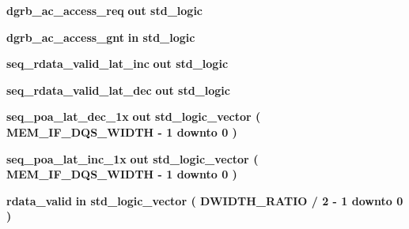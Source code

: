 \begin{DoxyCompactItemize}
\item 
{\bf dgrb\+\_\+ac\+\_\+access\+\_\+req}  {\bfseries {\bfseries \textcolor{keywordflow}{out}\textcolor{vhdlchar}{ }}} {\bfseries \textcolor{comment}{std\+\_\+logic}\textcolor{vhdlchar}{ }} 
\item 
{\bf dgrb\+\_\+ac\+\_\+access\+\_\+gnt}  {\bfseries {\bfseries \textcolor{keywordflow}{in}\textcolor{vhdlchar}{ }}} {\bfseries \textcolor{comment}{std\+\_\+logic}\textcolor{vhdlchar}{ }} 
\item 
{\bf seq\+\_\+rdata\+\_\+valid\+\_\+lat\+\_\+inc}  {\bfseries {\bfseries \textcolor{keywordflow}{out}\textcolor{vhdlchar}{ }}} {\bfseries \textcolor{comment}{std\+\_\+logic}\textcolor{vhdlchar}{ }} 
\item 
{\bf seq\+\_\+rdata\+\_\+valid\+\_\+lat\+\_\+dec}  {\bfseries {\bfseries \textcolor{keywordflow}{out}\textcolor{vhdlchar}{ }}} {\bfseries \textcolor{comment}{std\+\_\+logic}\textcolor{vhdlchar}{ }} 
\item 
{\bf seq\+\_\+poa\+\_\+lat\+\_\+dec\+\_\+1x}  {\bfseries {\bfseries \textcolor{keywordflow}{out}\textcolor{vhdlchar}{ }}} {\bfseries \textcolor{comment}{std\+\_\+logic\+\_\+vector}\textcolor{vhdlchar}{ }\textcolor{vhdlchar}{(}\textcolor{vhdlchar}{ }\textcolor{vhdlchar}{ }\textcolor{vhdlchar}{ }\textcolor{vhdlchar}{ }{\bfseries {\bf M\+E\+M\+\_\+\+I\+F\+\_\+\+D\+Q\+S\+\_\+\+W\+I\+D\+TH}} \textcolor{vhdlchar}{-\/}\textcolor{vhdlchar}{ } \textcolor{vhdldigit}{1} \textcolor{vhdlchar}{ }\textcolor{keywordflow}{downto}\textcolor{vhdlchar}{ }\textcolor{vhdlchar}{ } \textcolor{vhdldigit}{0} \textcolor{vhdlchar}{ }\textcolor{vhdlchar}{)}\textcolor{vhdlchar}{ }} 
\item 
{\bf seq\+\_\+poa\+\_\+lat\+\_\+inc\+\_\+1x}  {\bfseries {\bfseries \textcolor{keywordflow}{out}\textcolor{vhdlchar}{ }}} {\bfseries \textcolor{comment}{std\+\_\+logic\+\_\+vector}\textcolor{vhdlchar}{ }\textcolor{vhdlchar}{(}\textcolor{vhdlchar}{ }\textcolor{vhdlchar}{ }\textcolor{vhdlchar}{ }\textcolor{vhdlchar}{ }{\bfseries {\bf M\+E\+M\+\_\+\+I\+F\+\_\+\+D\+Q\+S\+\_\+\+W\+I\+D\+TH}} \textcolor{vhdlchar}{-\/}\textcolor{vhdlchar}{ } \textcolor{vhdldigit}{1} \textcolor{vhdlchar}{ }\textcolor{keywordflow}{downto}\textcolor{vhdlchar}{ }\textcolor{vhdlchar}{ } \textcolor{vhdldigit}{0} \textcolor{vhdlchar}{ }\textcolor{vhdlchar}{)}\textcolor{vhdlchar}{ }} 
\item 
{\bf rdata\+\_\+valid}  {\bfseries {\bfseries \textcolor{keywordflow}{in}\textcolor{vhdlchar}{ }}} {\bfseries \textcolor{comment}{std\+\_\+logic\+\_\+vector}\textcolor{vhdlchar}{ }\textcolor{vhdlchar}{(}\textcolor{vhdlchar}{ }\textcolor{vhdlchar}{ }\textcolor{vhdlchar}{ }\textcolor{vhdlchar}{ }{\bfseries {\bf D\+W\+I\+D\+T\+H\+\_\+\+R\+A\+T\+IO}} \textcolor{vhdlchar}{/}\textcolor{vhdlchar}{ } \textcolor{vhdldigit}{2} \textcolor{vhdlchar}{-\/}\textcolor{vhdlchar}{ } \textcolor{vhdldigit}{1} \textcolor{vhdlchar}{ }\textcolor{keywordflow}{downto}\textcolor{vhdlchar}{ }\textcolor{vhdlchar}{ } \textcolor{vhdldigit}{0} \textcolor{vhdlchar}{ }\textcolor{vhdlchar}{)}\textcolor{vhdlchar}{ }} 

\end{DoxyCompactItemize}
